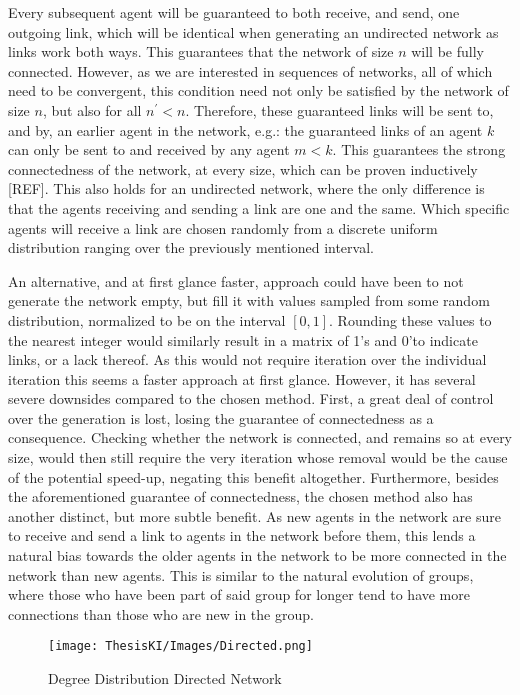 \documentclass{article}
\begin{document}
Every subsequent agent will be guaranteed to both receive, and send, one outgoing link, which will be identical when generating an undirected network as links work both ways. This guarantees that the network of size $n$ will be fully connected. However, as we are interested in sequences of networks, all of which need to be convergent, this condition need not only be satisfied by the network of size $n$, but also for all $n^{\prime} < n$. Therefore, these guaranteed links will be sent to, and by, an earlier agent in the network, e.g.: the guaranteed links of an agent $k$ can only be sent to and received by any agent $m < k$. This guarantees the strong connectedness of the network, at every size, which can be proven inductively [REF]. This also holds for an undirected network, where the only difference is that the agents receiving and sending a link are one and the same. Which specific agents will receive a link are chosen randomly from a discrete uniform distribution ranging over the previously mentioned interval. \newline 

An alternative, and at first glance faster, approach could have been to not generate the network empty, but fill it with values sampled from some random distribution, normalized to be on the interval $[0, 1]$. Rounding these values to the nearest integer would similarly result in a matrix of 1's and 0'to indicate links, or a lack thereof. As this would not require iteration over the individual iteration this seems a faster approach at first glance. However, it has several severe downsides compared to the chosen method. First, a great deal of control over the generation is lost, losing the guarantee of connectedness as a consequence. Checking whether the network is connected, and remains so at every size, would then still require the very iteration whose removal would be the cause of the potential speed-up, negating this benefit altogether. Furthermore, besides the aforementioned guarantee of connectedness, the chosen method also has another distinct, but more subtle benefit. As new agents in the network are sure to receive and send a link to agents in the network before them, this lends a natural bias towards the older agents in the network to be more connected in the network than new agents. This is similar to the natural evolution of groups, where those who have been part of said group for longer tend to have more connections than those who are new in the group.

\begin{center}
    \begin{figure}[!htbp]
        \centering
        \texttt{[image: ThesisKI/Images/Directed.png]}
        \caption{Degree Distribution Directed Network}
        \label{degree:instant}
    \end{figure}
\end{center}
\end{document}
